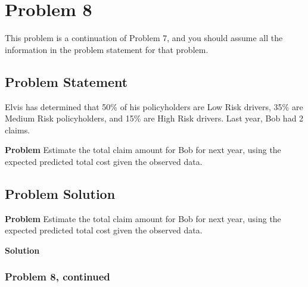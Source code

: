 \documentclass[12pt]{article}
\theoremstyle{definition}
\begin{document}
\newpage
\section*{Problem 8}

This problem is a continuation of Problem 7, and you should assume all the information in the problem statement for that problem.

\subsection*{Problem Statement}

Elvis has determined that 50\% of his policyholders are Low Risk drivers, 35\% are Medium Risk policyholders, and 15\% are High Risk drivers. Last year, Bob had 2 claims.

\bigskip
\noindent
{\bf Problem} Estimate the total claim amount for Bob for next year, using the expected predicted total cost given the observed data.

\subsection*{Problem Solution}

\noindent
{\bf Problem} Estimate the total claim amount for Bob for next year, using the expected predicted total cost given the observed data.

\bigskip
\noindent
{\bf Solution}


\newpage
\subsubsection*{Problem 8, continued}
\end{document}
